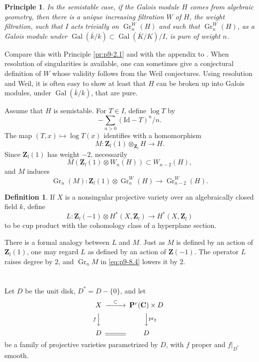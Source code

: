 \documentclass[11pt]{amsart}
\theoremstyle{plain}
\newtheorem{principle}[theorem]{Principle}
\theoremstyle{definition}
\newtheorem{definition}[theorem]{Definition}
\theoremstyle{remark}
\DeclareMathOperator{\Gr}{Gr}
\DeclareMathOperator{\Gal}{Gal}
\newcommand{\Z}{\mathbf{Z}}
\newcommand{\C}{\mathbf{C}}
\begin{document}
\begin{principle}\label{pr:p9-8.1}
In the semistable case, if the Galois module $H$ comes from algebraic geometry, then there is a unique increasing filtration $W$ of $H$, the weight filtration, such that $I$ acts trivially on $\Gr_n^W(H)$ and such that $\Gr_n^W(H)$, as a Galois module under $\Gal(\overline k/k)\subset \Gal(\overline K/K)/I$, is pure of weight $n$.
\end{principle}

Compare this with Principle \ref{pr:p9-2.1} and with the appendix to \cite{Tate}. When resolution of singularities is available, one can sometimes give a conjectural definition of $W$ whose validity follows from the Weil conjectures. Using resolution and Weil, it is often easy to show at least that $H$ can be broken up into Galois modules, under $\Gal(\overline k/k)$, that are pure.

Assume that $H$ is semistable. For $T\in I$, define $\log T$ by
\[
-\sum_{n>0}(\mathrm{Id}-T)^n/n.
\]
The map $(T,x)\mapsto \log T(x)$ identifies with a homomorphism
\begin{equation}\label{eq:p9-8.2}
M:\Z_l(1)\otimes_{\Z_l}H\to H.
\end{equation}
Since $\Z_l(1)$ has weight $-2$, necessarily
\begin{equation}\label{eq:p9-8.3}
M(\Z_l(1)\otimes W_n(H))\subset W_{n-2}(H),
\end{equation}
and $M$ induces
\begin{equation}\label{eq:p9-8.4}
\Gr_n(M):\Z_l(1)\otimes \Gr_n^W(H)\to \Gr_{n-2}^W(H).
\end{equation}

\begin{definition}\label{def:p9-8.5}
If $X$ is a nonsingular projective variety over an algebraically closed field $k$, define
\[
L:\Z_l(-1)\otimes H^*(X,\Z_l)\to H^*(X,\Z_l)
\]
to be cup product with the cohomology class of a hyperplane section.
\end{definition}

There is a formal analogy between $L$ and $M$. Just as $M$ is defined by an action of $\Z_l(1)$, one may regard $L$ as defined by an action of $\Z(-1)$. The operator $L$ raises degree by $2$, and $\Gr_n M$ in \eqref{eq:p9-8.4} lowers it by $2$.

\section{}\label{sec:p9-9}
Let $D$ be the unit disk, $D^*=D-\{0\}$, and let
\[
\begin{CD}
X @>{\subset}>> \mathbf P^r(\C)\times D\\
@V{f}VV @VV{\mathrm{pr}_2}V\\
D @= D
\end{CD}
\]
be a family of projective varieties parametrized by $D$, with $f$ proper and $f|_{D^*}$ smooth.
\end{document}
